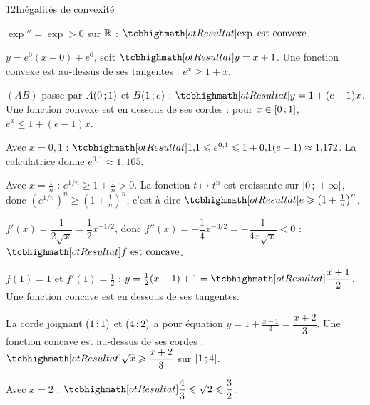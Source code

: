 \begin{corrige}{12}{Inégalités de convexité}
\begin{questions}
  \item $\exp''=\exp>0$ sur $\mathbb{R}$ : $\res{\exp\text{ est convexe}}$.
  \item $y=e^{0}(x-0)+e^{0}$, soit $\res{y=x+1}$. Une fonction convexe est au-dessus de ses tangentes : $e^{x}\geq1+x$.
  \item $(AB)$ passe par $A(0\,{;}\,1)$ et $B(1\,{;}\, e)$ : $\res{y=1+(e-1)x}$. Une fonction convexe est en dessous de ses cordes :
    pour $x\in\mathopen{[}0\,{;}\,1\mathclose{]}$, $e^{x}\leq1+(e-1)x$.
  \item Avec $x=0{,}1$ : $\res{1{,}1\leq e^{0,1}\leq1+0{,}1(e-1)\approx1{,}172}$. La calculatrice donne $e^{0,1}\approx1{,}105$.
  \item Avec $x=\frac1n$ : $e^{1/n}\geq1+\frac1n>0$. La fonction $t\mapsto t^{n}$ est croissante sur $\mathopen{[}0\,{;}\,+\infty\mathclose{[}$, donc
    $\left(e^{1/n}\right)^{n}\geq\left(1+\frac1n\right)^{n}$, c'est-à-dire $\res{e\geq\left(1+\frac1n\right)^{n}}$.
\end{questions}
\begin{questions}[resume]
  \item $f'(x)=\dfrac{1}{2\sqrt x}=\dfrac12x^{-1/2}$, donc $f''(x)=-\dfrac14x^{-3/2}=-\dfrac{1}{4x\sqrt x}<0$ : $\res{f\text{ est concave}}$.
  \item $f(1)=1$ et $f'(1)=\frac12$ : $y=\frac12(x-1)+1=\res{\dfrac{x+1}{2}}$. Une fonction concave est en dessous de ses tangentes.
  \item La corde joignant $(1\,{;}\,1)$ et $(4\,{;}\,2)$ a pour équation $y=1+\frac{x-1}{3}=\dfrac{x+2}{3}$. Une fonction concave est
    au-dessus de ses cordes : $\res{\sqrt x\geq\dfrac{x+2}{3}}$ sur $\mathopen{[}1\,{;}\,4\mathclose{]}$.
  \item Avec $x=2$ : $\res{\dfrac43\leq\sqrt2\leq\dfrac32}$.
\end{questions}


\end{corrige}
